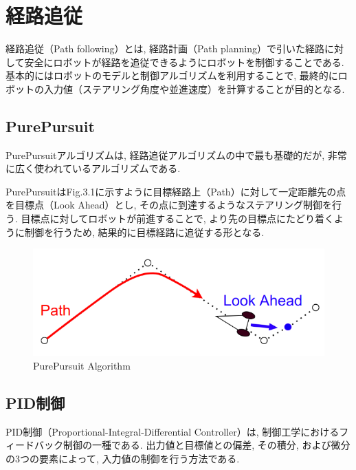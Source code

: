 
\section{経路追従}
経路追従（Path following）とは, 経路計画（Path planning）で引いた経路に対して安全にロボットが経路を追従できるようにロボットを制御することである.
基本的にはロボットのモデルと制御アルゴリズムを利用することで, 最終的にロボットの入力値（ステアリング角度や並進速度）を計算することが目的となる.

\subsection{PurePursuit}
PurePursuitアルゴリズムは, 経路追従アルゴリズムの中で最も基礎的だが, 非常に広く使われているアルゴリズムである.

PurePursuitはFig.3.1に示すように目標経路上（Path）に対して一定距離先の点を目標点（Look Ahead）とし, その点に到達するようなステアリング制御を行う.
目標点に対してロボットが前進することで, より先の目標点にたどり着くように制御を行うため, 結果的に目標経路に追従する形となる.

\begin{figure}[H]
  \centering
 \includegraphics[keepaspectratio, scale=0.5]
      {images/PurePursuit.png}
 \caption{PurePursuit Algorithm}
 \label{fig:purepursuit}
\end{figure}

\subsection{PID制御}
PID制御（Proportional-Integral-Differential Controller）は, 制御工学におけるフィードバック制御の一種である.
出力値と目標値との偏差, その積分, および微分の3つの要素によって, 入力値の制御を行う方法である.



\newpage
